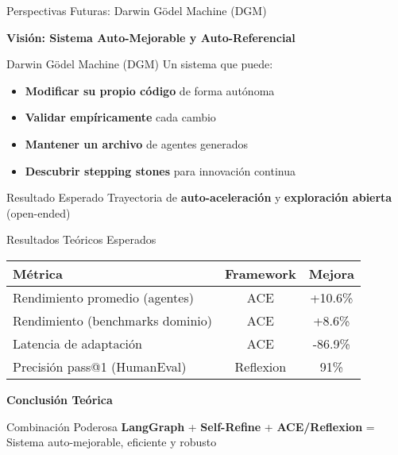 \documentclass[aspectratio=169,11pt]{beamer}
\begin{document}
\begin{frame}{Perspectivas Futuras: Darwin Gödel Machine (DGM)}
\begin{center}
\Large \textbf{Visión: Sistema Auto-Mejorable y Auto-Referencial}
\end{center}

\vspace{0.5cm}

\begin{block}{Darwin Gödel Machine (DGM)}
Un sistema que puede:
\begin{itemize}
    \item \textcolor{kavakblue}{\textbf{Modificar su propio código}} de forma autónoma
    \item \textcolor{kavakgreen}{\textbf{Validar empíricamente}} cada cambio
    \item \textcolor{kavakorange}{\textbf{Mantener un archivo}} de agentes generados
    \item \textcolor{kavakred}{\textbf{Descubrir stepping stones}} para innovación continua
\end{itemize}
\end{block}

\vspace{0.3cm}

\begin{exampleblock}{Resultado Esperado}
Trayectoria de \textbf{auto-aceleración} y \textbf{exploración abierta} (open-ended)
\end{exampleblock}
\end{frame}

\begin{frame}{Resultados Teóricos Esperados}
\begin{table}[h]
\centering
\begin{tabular}{|l|c|c|}
\hline
\textbf{Métrica} & \textbf{Framework} & \textbf{Mejora} \\ \hline
Rendimiento promedio (agentes) & ACE & \textcolor{kavakgreen}{+10.6\%} \\ \hline
Rendimiento (benchmarks dominio) & ACE & \textcolor{kavakgreen}{+8.6\%} \\ \hline
Latencia de adaptación & ACE & \textcolor{kavakgreen}{-86.9\%} \\ \hline
Precisión pass@1 (HumanEval) & Reflexion & \textcolor{kavakgreen}{91\%} \\ \hline
\end{tabular}
\end{table}

\vspace{0.5cm}

\begin{center}
\Large \textbf{Conclusión Teórica}
\end{center}

\begin{block}{Combinación Poderosa}
\textbf{LangGraph} + \textbf{Self-Refine} + \textbf{ACE/Reflexion} = \\
Sistema auto-mejorable, eficiente y robusto
\end{block}
\end{frame}
\end{document}
